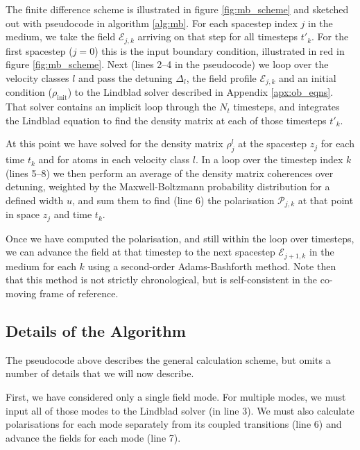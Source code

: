     The finite difference scheme is illustrated in figure \ref{fig:mb_scheme}
    and sketched out with pseudocode in algorithm \ref{alg:mb}. For each
    spacestep index $j$ in the medium, we take the field $\mathcal{E}_{j,k}$
    arriving on that step for all timesteps $t'_k$. For the first spacestep
    ($j\!=\!0$) this is the input boundary condition, illustrated in red in
    figure \ref{fig:mb_scheme}. Next (lines 2--4 in the pseudocode) we loop over
    the velocity classes $l$ and pass the detuning $\Delta_l$, the field profile
    $\mathcal{E}_{j,k}$ and an initial condition ($\rho_\mathrm{init}$) to the
    Lindblad solver described in Appendix \ref{apx:ob_eqns}. That solver
    contains an implicit loop through the $N_t$ timesteps, and integrates the
    Lindblad equation to find the density matrix at each of those timesteps
    $t'_k$.

    At this point we have solved for the density matrix $\rho^l_j$ at the
    spacestep $z_j$ for each time $t_k$ and for atoms in each velocity class
    $l$. In a loop over the timestep index $k$ (lines 5--8) we then perform an
    average of the density matrix coherences over detuning, weighted by the
    Maxwell-Boltzmann probability distribution for a defined width $u$, and sum
    them to find (line 6) the polarisation $\mathcal{P}_{j,k}$ at that point in
    space $z_j$ and time $t_k$.

    Once we have computed the polarisation, and still within the loop over
    timesteps, we can advance the field at that timestep to the next spacestep
    $\mathcal{E}_{j+1,k}$ in the medium for each $k$ using a second-order
    Adams-Bashforth method. Note then that this method is not strictly
    chronological, but is self-consistent in the co-moving frame of reference.

    \subsection{Details of the Algorithm}

    The pseudocode above describes the general calculation scheme, but omits a
    number of details that we will now describe.

    First, we have considered only a single field mode. For multiple modes, we
    must input all of those modes to the Lindblad solver (in line 3). We must
    also calculate polarisations for each mode separately from its coupled
    transitions (line 6) and advance the fields for each mode (line 7).

